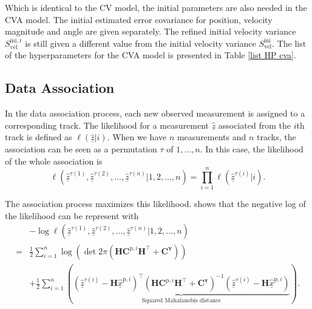 Which is identical to the CV model, the initial parameters are also needed in the CVA model. The initial estimated error covariance for position, velocity magnitude and angle are given separately. The refined initial velocity variance $S_{\mathrm{vel}}^{\mathrm{ini, r}}$ is still given a different value from the initial velocity variance $S_{\mathrm{vel}}^{\mathrm{ini}}$. The list of the hyperparameters for the CVA model is presented in Table \ref{list HP cva}.

\subsection{Data Association}
\label{Data Association soa}


In the data association process, each new observed measurement is assigned to a corresponding track. The likelihood for a measurement $\underline{\hat{z}}$ associated from the $i$th track is defined as $\ell(\underline{\hat{z}}|i)$. When we have $n$ measurements and $n$ tracks, the association can be seen as a permutation $\tau$ of ${1,...,n}$. In this case, the likelihood of the whole association is 
\begin{equation}
    \ell(\underline{\hat{z}}^{\tau(1)},\underline{\hat{z}}^{\tau(2)},...,\underline{\hat{z}}^{\tau(n)}|1,2,...,n)=\prod_{i=1}^{n}\ell(\underline{\hat{z}}^{\tau(i)}|i).
\end{equation}

The association process maximizes this likelihood. \cite{pfaff2019multitarget} shows that the negative log of the likelihood can be represent with 
\begin{equation}
\begin{aligned}
    \label{likelihood}
    &-\log\ell(\underline{\hat{z}}^{\tau(1)},\underline{\hat{z}}^{\tau(2)},...,\underline{\hat{z}}^{\tau(n)}|1,2,...,n)\\
    =&\frac{1}{2}\sum_{i=1}^{n}\log \left (\det 2 \pi(\textbf{H}\textbf{C}^{\mathrm{p},i}\textbf{H}^\top+\mathbf{C}^{\underline{\boldsymbol{v}}})\right )\\
    &+\frac{1}{2}\sum_{i=1}^{n}\left ( \underset{\text{Squared Mahalanobis distance}}{\underbrace{(\underline{\hat{z}}^{\tau(i)}-\textbf{H}\underline{\hat{x}}^{\mathrm{p},i})^\top(\textbf{H}\textbf{C}^{\mathrm{p},i}\textbf{H}^\top+\mathbf{C}^{\underline{\boldsymbol{v}}})^{-1}(\underline{\hat{z}}^{\tau(i)}-\textbf{H}\underline{\hat{x}}^{\mathrm{p},i})}} \right ).
\end{aligned}
\end{equation}

